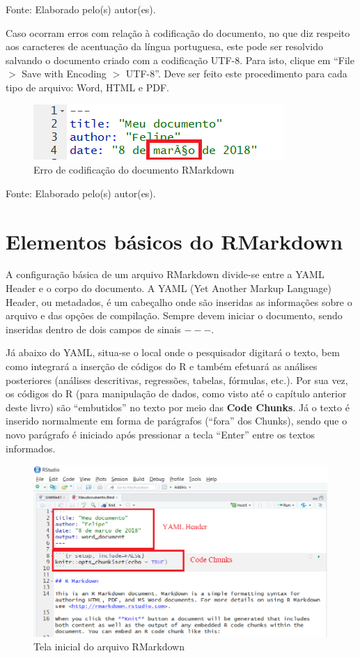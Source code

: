 \documentclass[12pt,brazil,oneside]{book}
\begin{document}
Fonte: Elaborado pelo(s) autor(es).

Caso ocorram erros com relação à codificação do documento, no que diz
respeito aos caracteres de acentuação da língua portuguesa, este pode
ser resolvido salvando o documento criado com a codificação UTF-8. Para
isto, clique em ``File \(>\) Save with Encoding \(>\) UTF-8''. Deve ser
feito este procedimento para cada tipo de arquivo: Word, HTML e PDF.

\begin{figure}[H]

{\centering \includegraphics[width=0.6\linewidth]{errocodif} 

}

\caption{Erro de codificação do documento RMarkdown}\label{fig:errocodif}
\end{figure}

Fonte: Elaborado pelo(s) autor(es).

\hypertarget{elementos-basicos-do-rmarkdown}{%
\section{Elementos básicos do
RMarkdown}\label{elementos-basicos-do-rmarkdown}}

A configuração básica de um arquivo RMarkdown divide-se entre a YAML
Header e o corpo do documento. A YAML (Yet Another Markup Language)
Header, ou metadados, é um cabeçalho onde são inseridas as informações
sobre o arquivo e das opções de compilação. Sempre devem iniciar o
documento, sendo inseridas dentro de dois campos de sinais \(---\).

Já abaixo do YAML, situa-se o local onde o pesquisador digitará o texto,
bem como integrará a inserção de códigos do R e também efetuará as
análises posteriores (análises descritivas, regressões, tabelas,
fórmulas, etc.). Por sua vez, os códigos do R (para manipulação de
dados, como visto até o capítulo anterior deste livro) são ``embutidos''
no texto por meio das \textbf{Code Chunks}. Já o texto é inserido
normalmente em forma de parágrafos (``fora'' dos Chunks), sendo que o
novo parágrafo é iniciado após pressionar a tecla ``Enter'' entre os
textos informados.

\begin{figure}[H]

{\centering \includegraphics[width=0.6\linewidth]{rmark2} 

}

\caption{Tela inicial do arquivo RMarkdown}\label{fig:rmark2}
\end{figure}
\end{document}
